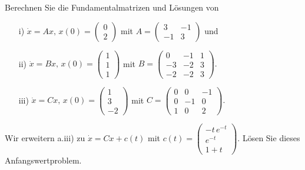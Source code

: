 \begin{Problem}
	\begin{parts}
		\item Berechnen Sie die Fundamentalmatrizen und Lösungen von
		\begin{enumerate}
			\item[i)] $\dot{x} = Ax, \, x(0) = \begin{pmatrix} 0 \\ 2 \end{pmatrix}$ mit 
			$
			A = \begin{pmatrix}
				3 & -1 \\
				-1 & 3
			\end{pmatrix}
			$
			und
			\item[ii)] $\dot{x} = Bx, \, x(0) = \begin{pmatrix} 1 \\ 1 \\ 1 \end{pmatrix}$ mit 
			$
			B = \begin{pmatrix}
				0 & -1 & 1 \\
				-3 & -2 & 3 \\
				-2 & -2 & 3
			\end{pmatrix}.
			$
			\item[iii)] $\dot{x} = Cx, \, x(0) = \begin{pmatrix} 1 \\ 3 \\ -2 \end{pmatrix}$ mit 
			$
			C = \begin{pmatrix}
				0 & 0 & -1 \\
				0 & -1 & 0 \\
				1 & 0 & 2
			\end{pmatrix}.
			$
		\end{enumerate}
		
		\item Wir erweitern a.iii) zu $\dot{x} = Cx + c(t)$ mit 
		$
		c(t) = \begin{pmatrix}
			-t \, e^{-t} \\
			e^{-t} \\
			1 + t
		\end{pmatrix}.
		$
		Lösen Sie dieses Anfangswertproblem.
	\end{parts}
\end{Problem}
